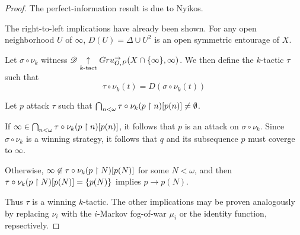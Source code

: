 \begin{proof}
  The perfect-information result is due to Nyikos.

  The right-to-left implications have already been shown.
  For any open neighborhood $U$ of $\infty$,
  $D(U)=\Delta\cup U^2$ is an open symmetric entourage of $X$.

  Let $\sigma\circ\nu_k$ witness
  $\mathscr{D} \underset{k\text{-tact}}{\uparrow}Gru_{O,P}^{\to}(X\cap\{\infty\},\infty)$. We then define
  the $k$-tactic $\tau$ such that
    \[
      \tau\circ\nu_k(t) = D(\sigma\circ\nu_k(t))
    \]

  Let $p$ attack $\tau$ such that
  $\bigcap_{n<\omega}\tau\circ\nu_k(p\restriction n)[p(n)]\not=\emptyset$.

  If $\infty\in\bigcap_{n<\omega}\tau\circ\nu_k(p\restriction n)[p(n)]$, it follows
  that $p$
  is an attack on $\sigma\circ\nu_k$. Since $\sigma\circ\nu_k$ is a winning
  strategy, it follows
  that $q$ and its subsequence $p$ must coverge to $\infty$.

  Otherwise, $\infty\not\in\tau\circ\nu_k(p\restriction N)[p(N)]$ for some $N<\omega$,
  and then
  $\tau\circ\nu_k(p\restriction N)[p(N)]=\{p(N)\}$ implies $p\to p(N)$.

  Thus $\tau$ is a winning $k$-tactic. The other implications may
  be proven analogously by
  replacing $\nu_i$ with the $i$-Markov fog-of-war $\mu_i$ or the identity
  function, repsectively.
\end{proof}



